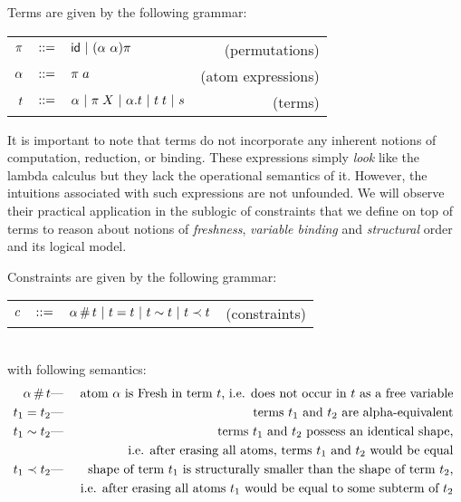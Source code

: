 \documentclass[english, mgr]{iithesis}
\begin{document}
Terms are given by the following grammar: \\
\begin{tabular}{rclr}
    $\pi$    & $::=$ & $\mathsf{id}
                   \ |\  (\alpha\ \alpha) \pi$
        & (permutations) \\
    $\alpha$ & $::=$ & $\pi \; a$
        & (atom expressions) \\
    $t$    & $::=$ & $\alpha
                   \ |\  \pi \; X
                   \ |\  \alpha. t
                   \ |\  t \; t
                   \ |\  s$
        & (terms)
\end{tabular}

It is important to note that terms do not incorporate any inherent notions of
computation, reduction, or binding.
These expressions simply \textit{look} like the lambda calculus but they lack
the operational semantics of it.
However, the intuitions associated with such expressions are not unfounded.
We will observe their practical application in the sublogic of constraints
that we define on top of terms to reason about
notions of \textit{freshness}, \textit{variable binding} and \textit{structural}
order and its logical model.

Constraints are given by the following grammar:
\\
\begin{tabular}{rclr}
    $c$  & $::=$ & $\alpha \,\#\, t
                   \ |\  t = t
                   \ |\  t \sim t
                   \ |\  t \prec t$
        & (constraints)
\end{tabular}
\\
with following semantics:
\begin{eqnarray*}
  \alpha \,\#\, t & \text{---} & \text{
    atom $\alpha$ is {Fresh} in term $t$, i.e. does not occur in $t$
    as a free variable
  } \\
  t_1 = t_2 & \text{---} &\text{
    terms $t_1$ and $t_2$ are alpha-equivalent
  } \\
  t_1 \sim t_2 & \text{---} &\text{
    terms $t_1$ and $t_2$ possess an identical shape,
  } \\
  & & \text{
    i.e. after erasing all atoms, terms $t_1$ and $t_2$ would be equal
  } \\
  t_1 \prec t_2 & \text{---} &\text{
    shape of term $t_1$ is structurally smaller than the shape of term
    $t_2$,
  } \\
  & & \text{
    i.e. after erasing all atoms $t_1$ would be equal to some
    subterm of $t_2$
  } \\
\end{eqnarray*}
\end{document}
